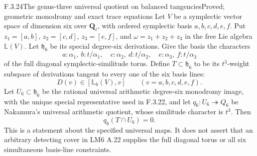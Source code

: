 \begin{result}{F.3.24}{The genus-three universal quotient on balanced tangencies}{Proved; geometric monodromy and exact trace equations}
Let $V$ be a symplectic vector space of dimension six over
$\mathbf Q_\ell$, with ordered symplectic basis
$a,b,c,d,e,f$. Put $z_1=[a,b]$, $z_2=[c,d]$,
$z_3=[e,f]$, and $\omega=z_1+z_2+z_3$ in the free Lie
algebra $\mathbb L(V)$. Let $\mathfrak h_6$ be its special
degree-six derivations. Give the basis the characters
\[
 a:\alpha_1,\ b:t/\alpha_1,\quad
 c:\alpha_2,\ d:t/\alpha_2,\quad
 e:\alpha_3,\ f:t/\alpha_3
\]
of the full diagonal symplectic-similitude torus. Define
$T\subset\mathfrak h_6$ to be its $t^3$-weight subspace
of derivations tangent to every one of the six basis lines:
\[
 D(v)\in[\mathbb L_6(V),v]\qquad(v=a,b,c,d,e,f).
\]
Let $U_6\subset\mathfrak h_6$ be the rational universal
arithmetic degree-six monodromy image, with the unique
special representative used in F.3.22, and let
$q_6:U_6\twoheadrightarrow Q_6$ be Nakamura's universal
arithmetic quotient, whose similitude character is $t^3$\cite{AuditNakamura1996}.
Then
\[
                         q_6(T\cap U_6)=0.                 \tag{G3.1}
\]
This is a statement about the specified universal maps.
It does not assert that an arbitrary detecting cover in
LM6 A.22 supplies the full diagonal torus or all six
simultaneous basis-line constraints.

\end{result}
